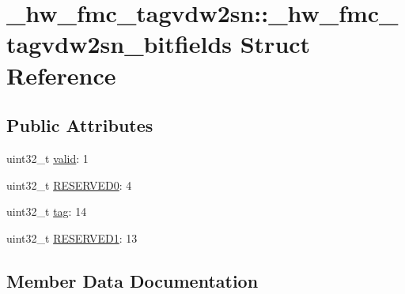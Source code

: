 \hypertarget{struct__hw__fmc__tagvdw2sn_1_1__hw__fmc__tagvdw2sn__bitfields}{}\section{\+\_\+hw\+\_\+fmc\+\_\+tagvdw2sn\+:\+:\+\_\+hw\+\_\+fmc\+\_\+tagvdw2sn\+\_\+bitfields Struct Reference}
\label{struct__hw__fmc__tagvdw2sn_1_1__hw__fmc__tagvdw2sn__bitfields}
\subsection*{Public Attributes}
\begin{DoxyCompactItemize}
\item 
uint32\+\_\+t \hyperlink{struct__hw__fmc__tagvdw2sn_1_1__hw__fmc__tagvdw2sn__bitfields_a0e7da1735b5140608cf6ac9ae0e8fc3c}{valid}\+: 1
\item 
uint32\+\_\+t \hyperlink{struct__hw__fmc__tagvdw2sn_1_1__hw__fmc__tagvdw2sn__bitfields_a0672ee728abbe9aed89b4c7fc1357332}{R\+E\+S\+E\+R\+V\+E\+D0}\+: 4
\item 
uint32\+\_\+t \hyperlink{struct__hw__fmc__tagvdw2sn_1_1__hw__fmc__tagvdw2sn__bitfields_a9e28df8409ff29c571c01e979cac9ebb}{tag}\+: 14
\item 
uint32\+\_\+t \hyperlink{struct__hw__fmc__tagvdw2sn_1_1__hw__fmc__tagvdw2sn__bitfields_a733e738fbbe8645c724240baffde3fd9}{R\+E\+S\+E\+R\+V\+E\+D1}\+: 13
\end{DoxyCompactItemize}


\subsection{Member Data Documentation}
